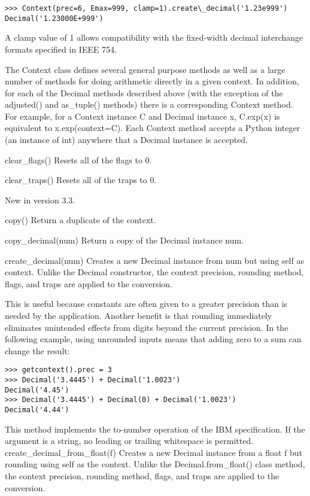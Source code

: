 \begin{lstlisting}
>>> Context(prec=6, Emax=999, clamp=1).create\_decimal('1.23e999')
Decimal('1.23000E+999')
\end{lstlisting}

A clamp value of 1 allows compatibility with the fixed-width decimal interchange formats specified in IEEE 754.

The Context class defines several general purpose methods as well as a large number of methods for doing arithmetic directly in a given context. In addition, for each of the Decimal methods described above (with the exception of the adjusted() and as\_tuple() methods) there is a corresponding Context method. For example, for a Context instance C and Decimal instance x, C.exp(x) is equivalent to x.exp(context=C). Each Context method accepts a Python integer (an instance of int) anywhere that a Decimal instance is accepted.

clear\_flags()
Resets all of the flags to 0.

clear\_traps()
Resets all of the traps to 0.


New in version 3.3.

copy()
Return a duplicate of the context.

copy\_decimal(num)
Return a copy of the Decimal instance num.

create\_decimal(num)
Creates a new Decimal instance from num but using self as context. Unlike the Decimal constructor, the context precision, rounding method, flags, and traps are applied to the conversion.

This is useful because constants are often given to a greater precision than is needed by the application. Another benefit is that rounding immediately eliminates unintended effects from digits beyond the current precision. In the following example, using unrounded inputs means that adding zero to a sum can change the result:

\begin{lstlisting}
>>> getcontext().prec = 3
>>> Decimal('3.4445') + Decimal('1.0023')
Decimal('4.45')
>>> Decimal('3.4445') + Decimal(0) + Decimal('1.0023')
Decimal('4.44')
\end{lstlisting}

This method implements the to-number operation of the IBM specification. If the argument is a string, no leading or trailing whitespace is permitted.
create\_decimal\_from\_float(f)
Creates a new Decimal instance from a float f but rounding using self as the context. Unlike the Decimal.from\_float() class method, the context precision, rounding method, flags, and traps are applied to the conversion.

